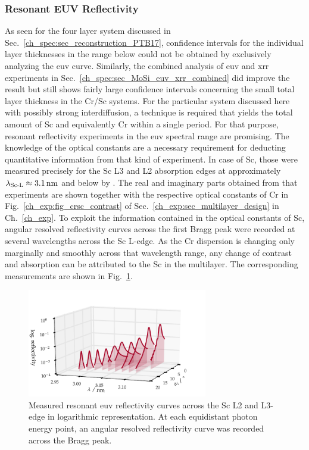 \subsubsection{Resonant EUV Reflectivity}
As seen for the four layer system discussed in Sec.~\ref{ch_spec:sec_reconstruction_PTB17}, confidence intervals for the individual layer thicknesses in the range below  could not be obtained by exclusively analyzing the \gls{euv} curve. Similarly, the combined analysis of \gls{euv} and \gls{xrr} experiments in Sec.~\ref{ch_spec:sec_MoSi_euv_xrr_combined} did improve the result but still shows fairly large confidence intervals concerning the small total layer thickness in the Cr/Sc systems. For the particular system discussed here with possibly strong interdiffusion, a technique is required that yields the total amount of Sc and equivalently Cr within a single period. For that purpose, resonant reflectivity experiments in the \gls{euv} spectral range are promising. The knowledge of the optical constants are a necessary requirement for deducting quantitative information from that kind of experiment. In case of Sc, those were measured precisely for the Sc L3 and L2 absorption edges at approximately $\lambda_\text{Sc-L} \approx \nm{3.1}$ and below by \textcite{aquila_measurements_2004}. The real and imaginary parts obtained from that experiments are shown together with the respective optical constants of Cr in Fig.~\ref{ch_exp:fig_crsc_contrast} of Sec.~\ref{ch_exp:sec_multilayer_design} in  Ch.~\ref{ch_exp}. To exploit the information contained in the optical constants of Sc, angular resolved reflectivity curves across the first Bragg peak were recorded at several wavelengths across the Sc L-edge. As the Cr dispersion is changing only marginally and smoothly across that wavelength range, any change of contrast and absorption can be attributed to the Sc in the multilayer. The corresponding measurements are shown in Fig.~\ref{ch_spec:fig_CrSc_REUV_data}.
\begin{figure}[htbp]
  \centering
  \includegraphics[width=0.7\textwidth]{img/CrSc_REUV_data}
  \caption{Measured resonant \gls{euv} reflectivity curves across the Sc L2 and L3-edge in logarithmic representation. At each equidistant photon energy point, an angular resolved reflectivity curve was recorded across the Bragg peak.}
  \label{ch_spec:fig_CrSc_REUV_data}
\end{figure}
